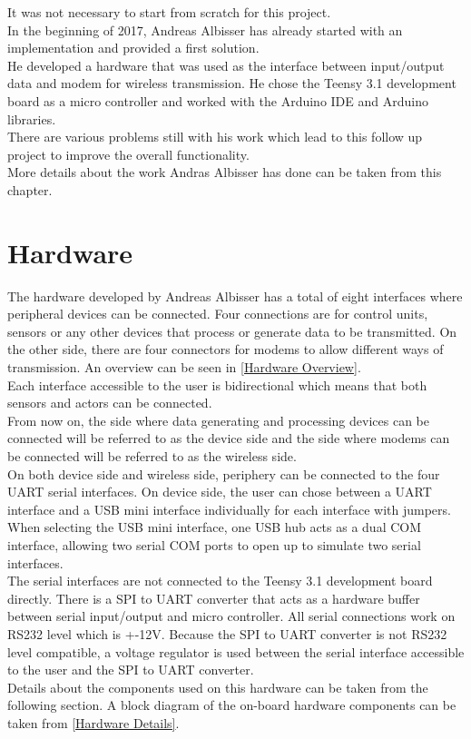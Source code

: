 %
%
It was not necessary to start from scratch for this project. \\
In the beginning of 2017, Andreas Albisser has already started with an implementation and provided a first solution. \\
He developed a hardware that was used as the interface between input/output data and modem for wireless transmission. He chose the Teensy 3.1 development board as a micro controller and worked with the Arduino IDE and Arduino libraries. \\
There are various problems still with his work which lead to this follow up project to improve the overall functionality.\\
More details about the work Andras Albisser has done can be taken from this chapter. \\
%
%
%
\section{Hardware}
The hardware developed by Andreas Albisser has a total of eight interfaces where peripheral devices can be connected. Four connections are for control units, sensors or any other devices that process or generate data to be transmitted. On the other side, there are four connectors for modems to allow different ways of transmission. An overview can be seen in \autoref{Hardware Overview}.\\
%
Each interface accessible to the user is bidirectional which means that both sensors and actors can be connected.\\
From now on, the side where data generating and processing devices can be connected will be referred to as the device side and the side where modems can be connected will be referred to as the wireless side.\\
On both device side and wireless side, periphery can be connected to the four UART serial interfaces. On device side, the user can chose between a UART interface and a USB mini interface individually for each interface with jumpers. When selecting the USB mini interface, one USB hub acts as a dual COM interface, allowing two serial COM ports to open up to simulate two serial interfaces. \\
The serial interfaces are not connected to the Teensy 3.1 development board directly. There is a SPI to UART converter that acts as a hardware buffer between serial input/output and micro controller.
All serial connections work on RS232 level which is +-12V. Because the SPI to UART converter is not RS232 level compatible, a voltage regulator is used between the serial interface accessible to the user and the SPI to UART converter.\\
Details about the components used on this hardware can be taken from the following section.
A block diagram of the on-board hardware components can be taken from \autoref{Hardware Details}.\\
%
%
